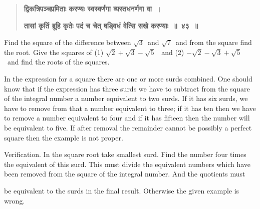 \documentclass[]{article}
\begin{document}
{\begin{quote}
{{\textbf{{\color{red}द्विकत्रिपञ्चप्रमिताः करण्यः स्वस्वर्णगा व्यस्तधनर्णगा वा~। }}

\textbf{{\color{red}तासां कृतिं ब्रूहि कृतेः पदं च चेत् षड्विधं वेत्सि सखे करण्याः~॥~४३~॥}}}
}  \end{quote}

{Find the square of the difference between $\sqrt{3}$ \,and $\sqrt{7}$ \,and from
the square find the root. Give the squares of (1) $\sqrt{2} + \sqrt{3} -
\sqrt{5}$ ~and (2) $- \sqrt{2} - \sqrt{3} + \sqrt{5}$ ~and find the roots of the
squares.}

\begin{quote}  {
}  \end{quote}

{In the expression for a square there are one or more surds combined.
One should know that if the expression has three surds we have to
subtract from the square of the integral number a number equivalent to
two surds. If it has six surds, we have to remove from that a number
equivalent to three; if it has ten then we have to remove a number
equivalent to four and if it has fifteen then the number will be
equivalent to five. If after removal the remainder cannot be possibly a
perfect square then the example is not proper.}

{Verification. In the square root take smallest surd. Find the number
four times the equivalent of this surd. This must divide the equivalent
numbers which have been removed from the square of the integral number.
And the quotients must}
\newpage
\large

\noindent be equivalent to the surds in the final result. Otherwise the given
example is wrong.

}
\end{document}
